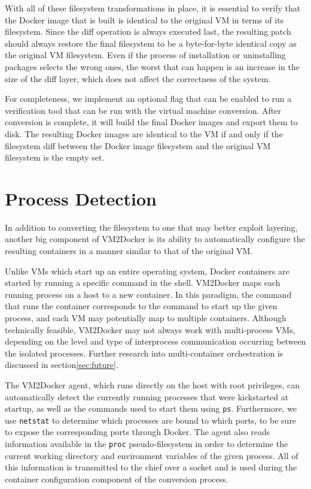 With all of these filesystem transformations in place, it is essential to verify that the Docker image that is built is identical to the original VM in terms of its filesystem. Since the diff operation is always executed last, the resulting patch should always restore the final filesystem to be a byte-for-byte identical copy as the original VM filesystem. Even if the process of installation or uninstalling packages selects the wrong ones, the worst that can happen is an increase in the size of the diff layer, which does not affect the correctness of the system.

For completeness, we implement an optional flag that can be enabled to run a verification tool that can be run with the virtual machine conversion. After conversion is complete, it will build the final Docker images and export them to disk. The resulting Docker images are identical to the VM if and only if the filesystem diff between the Docker image filesystem and the original VM filesystem is the empty set.
\section{Process Detection}
In addition to converting the filesystem to one that may better exploit layering, another big component of VM2Docker is its ability to automatically configure the resulting containers in a manner similar to that of the original VM.

Unlike VMs which start up an entire operating system, Docker containers are started by running a specific command in the shell. VM2Docker maps each running process on a host to a new container. In this paradigm, the command that runs the container corresponds to the command to start up the given process, and each VM may potentially map to multiple containers. Although technically feasible, VM2Docker may not always work with multi-process VMs, depending on the level and type of interprocess communication occurring between the isolated processes. Further research into multi-container orchestration is discussed in section\ref{sec:future}.

The VM2Docker agent, which runs directly on the host with root privileges, can automatically detect the currently running processes that were kickstarted at startup, as well as the commands used to start them using \texttt{ps}. Furthermore, we use \texttt{netstat} to determine which processes are bound to which ports, to be sure to expose the corresponding ports through Docker. The agent also reads information available in the \texttt{proc} pseudo-filesystem in order to determine the current working directory and environment variables of the given process. All of this information is transmitted to the chief over a socket and is used during the container configuration component of the conversion process.

